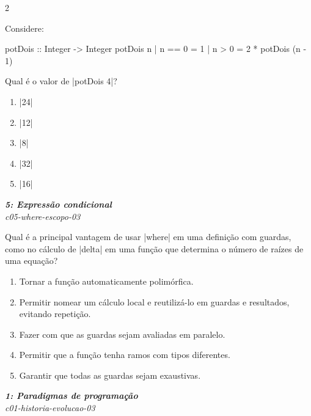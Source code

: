 \documentclass[a4paper,10pt,brazil]{article}
\begin{document}
\begin{multicols}{2}
\begin{flushright}
\end{flushright}
Considere:
\begin{haskellcode}
potDois :: Integer -> Integer
potDois n
  | n == 0 = 1
  | n > 0  = 2 * potDois (n - 1)
\end{haskellcode}
Qual é o valor de \haskellinline|potDois 4|?

\begin{enumerate}
  \item \haskellinline|24|

  \item \haskellinline|12|

  \item \haskellinline|8|

  \item \haskellinline|32|

  \item \haskellinline|16|


\end{enumerate}

\begin{flushright}
  \footnotesize
  \textit{\textbf{5: Expressão condicional}}\\
  \textit{c05-where-escopo-03}\\

\end{flushright}
Qual é a principal vantagem de usar \haskellinline|where| em uma definição com guardas, como no cálculo de \haskellinline|delta| em uma função que determina o número de raízes de uma equação?

\begin{enumerate}
  \item Tornar a função automaticamente polimórfica.

  \item Permitir nomear um cálculo local e reutilizá-lo em guardas e resultados, evitando repetição.

  \item Fazer com que as guardas sejam avaliadas em paralelo.

  \item Permitir que a função tenha ramos com tipos diferentes.

  \item Garantir que todas as guardas sejam exaustivas.


\end{enumerate}

\begin{flushright}
  \footnotesize
  \textit{\textbf{1: Paradigmas de programação}}\\
  \textit{c01-historia-evolucao-03}\\


\end{flushright}
\end{multicols}
\end{document}
